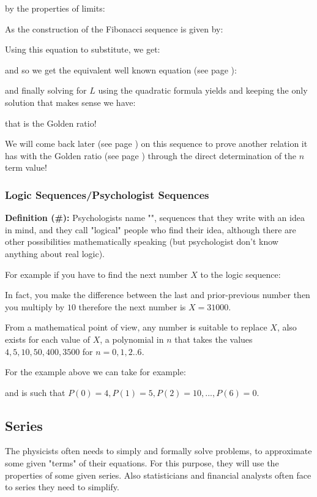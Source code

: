 	by the properties of limits:
	
	As the construction of the Fibonacci sequence is given by:
	
	Using this equation to substitute, we get:
	
	and so we get the equivalent well known equation (see page \pageref{golden ratio}):
	
	and finally solving for $L$ using the quadratic formula yields and keeping the only solution that makes sense we have:
	
	that is the Golden ratio!
	
	We will come back later (see page \pageref{ordinary generating function}) on this sequence to prove another relation it has with the Golden ratio (see page \pageref{golden ratio}) through the direct determination of the $n$ term value!

	\subsubsection{Logic Sequences/Psychologist Sequences}
	\textbf{Definition (\#\mydef):} Psychologists name "", sequences that they write with an idea in mind, and they call "logical" people who find their idea, although there are other possibilities mathematically speaking (but psychologist don't know anything about real logic).
	
	For example if you have to find the next number $X$ to the logic sequence:
	
	In fact, you make the difference between the last and prior-previous number then you multiply by $10$ therefore the next number is $X=31000$.
	
	From a mathematical point of view, any number is suitable to replace $X$, also exists for each value of $X$, a polynomial in $n$ that takes the values $4, 5, 10, 50, 400, 3500$ for $n = 0, 1 , 2 ..6$.
	
	For the example above we can take for example:
	
	and is such that $P(0)=4, P(1)=5, P(2)=10, ...,P(6)=0$.

	\pagebreak
	\subsection{Series}

The physicists often needs to simply and formally solve problems, to approximate some given "terms" of their equations. For this purpose, they will use the properties of some given series. Also statisticians and financial analysts often face to series they need to simplify.

